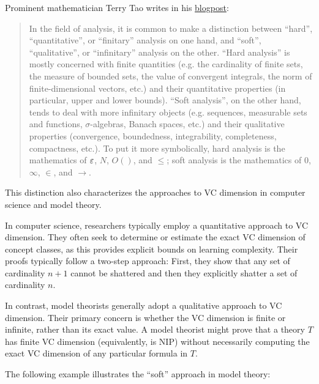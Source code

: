 \begin{remark}
    Prominent mathematician Terry Tao writes in his \href{https://terrytao.wordpress.com/2007/05/23/soft-analysis-hard-analysis-and-the-finite-convergence-principle/}{blogpost}:
    
    \begin{quote}
        In the field of analysis, it is common to make a distinction between \enquote{hard}, \enquote{quantitative}, or \enquote{finitary} analysis on one hand, and \enquote{soft}, \enquote{qualitative}, or \enquote{infinitary} analysis on the other. \enquote{Hard analysis} is mostly concerned with finite quantities (e.g. the cardinality of finite sets, the measure of bounded sets, the value of convergent integrals, the norm of finite-dimensional vectors, etc.) and their quantitative properties (in particular, upper and lower bounds). \enquote{Soft analysis}, on the other hand, tends to deal with more infinitary objects (e.g. sequences, measurable sets and functions, $\sigma$-algebras, Banach spaces, etc.) and their qualitative properties (convergence, boundedness, integrability, completeness, compactness, etc.). To put it more symbolically, hard analysis is the mathematics of $\varepsilon$, $N$, $O()$, and $\leq$; soft analysis is the mathematics of $0$, $\infty$, $\in$, and $\to$.
    \end{quote}
    
    This distinction also characterizes the approaches to VC dimension in computer science and model theory.

    In computer science, researchers typically employ a quantitative approach to VC dimension. They often seek to determine or estimate the exact VC dimension of concept classes, as this provides explicit bounds on learning complexity. Their proofs typically follow a two-step approach:
    First, they show that any set of cardinality $n+1$ cannot be shattered and then they explicitly shatter a set of cardinality $n$. 

    In contrast, model theorists generally adopt a qualitative approach to VC dimension. Their primary concern is whether the VC dimension is finite or infinite, rather than its exact value. A model theorist might prove that a theory $T$ has finite VC dimension (equivalently, is NIP) without necessarily computing the exact VC dimension of any particular formula in $T$.
\end{remark}

The following example illustrates the \enquote{soft} approach in model theory:

